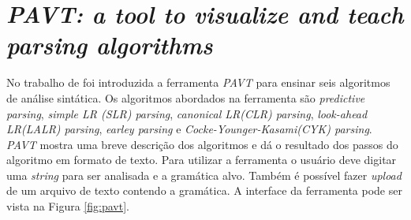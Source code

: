 
\section{\textit{PAVT: a tool to visualize and teach parsing algorithms}}
No trabalho de \textcite{sangal2018pavt} foi introduzida a ferramenta \textit{PAVT} para ensinar seis algoritmos de análise sintática. Os algoritmos abordados na ferramenta são \textit{predictive parsing}, \textit{simple LR (SLR) parsing}, \textit{canonical LR(CLR) parsing}, \textit{look-ahead LR(LALR) parsing}, \textit{earley parsing} e \textit{Cocke-Younger-Kasami(CYK) parsing}. \textit{PAVT} mostra uma breve descrição dos algoritmos e dá o resultado dos passos do algoritmo em formato de texto. Para utilizar a ferramenta o usuário deve digitar uma \textit{string} para ser analisada e a gramática alvo. Também é possível fazer \textit{upload} de um arquivo de texto contendo a gramática. A interface da ferramenta pode ser vista na Figura \ref{fig:pavt}.
\begin{figure}[ht]
    \captionsetup{width=16cm}
\end{figure}

